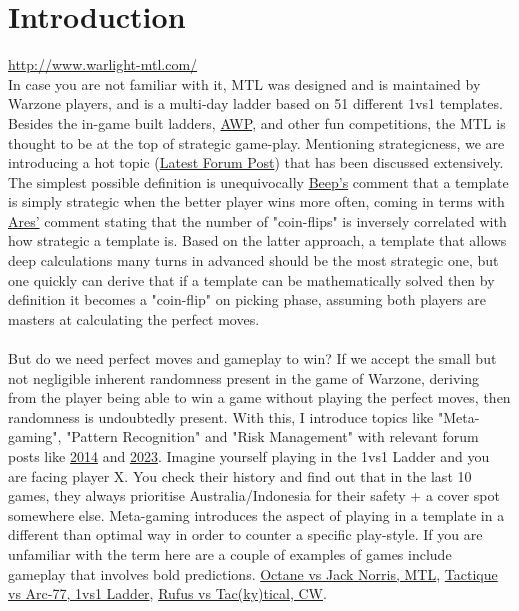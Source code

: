 \newpage
\section{Introduction} \label{introduction}


\url{http://www.warlight-mtl.com/}
\newline
\\
In case you are not familiar with it, MTL was designed and is maintained by Warzone players, and is a multi-day ladder based on 51 different 1vs1 templates. Besides the in-game built ladders, \href{https://www.warzone.com/Forum/262655-awp-world-tour-magazine}{AWP}, and other fun competitions, the MTL is thought to be at the top of strategic game-play. Mentioning strategicness, we are introducing a hot topic (\href{https://www.warzone.com/Forum/721296-makes-template-strategic}{Latest Forum Post}) that has been discussed extensively. The simplest possible definition is unequivocally \href{https://www.warzone.com/Forum/721296-makes-template-strategic?Offset=16}{Beep's} comment that a template is simply strategic when the better player wins more often, coming in terms with \href{https://www.warzone.com/Forum/721296-makes-template-strategic?Offset=8}{Ares'} comment stating that the number of "coin-flips" is inversely correlated with how strategic a template is. Based on the latter approach, a template that allows deep calculations many turns in advanced should be the most strategic one, but one quickly can derive that if a template can be mathematically solved then by definition it becomes a "coin-flip" on picking phase, assuming both players are masters at calculating the perfect moves. 
\\
\\
But do we need perfect moves and gameplay to win? If we accept the small but not negligible inherent randomness present in the game of Warzone, deriving from the player being able to win a game without playing the perfect moves, then randomness is undoubtedly present. With this, I introduce topics like "Meta-gaming", "Pattern Recognition" and "Risk Management" with relevant forum posts like \href{https://www.warzone.com/Forum/52866-metagame}{2014} and \href{https://www.warzone.com/Forum/735633-pinnacle-metagaming}{2023}. Imagine yourself playing in the 1vs1 Ladder and you are facing player X. You check their history and find out that in the last 10 games, they always prioritise Australia/Indonesia for their safety + a cover spot somewhere else. Meta-gaming introduces the aspect of playing in a template in a different than optimal way in order to counter a specific play-style. If you are unfamiliar with the term here are a couple of examples of games include gameplay that involves bold predictions. \href{https://www.warzone.com/MultiPlayer?GameID=37186464}{Octane vs Jack Norris, MTL}, \href{https://www.warzone.com/MultiPlayer?GameID=36615381}{Tactique vs Arc-77, 1vs1 Ladder}, \href{https://www.warzone.com/MultiPlayer?GameID=35830458}{Rufus vs Tac(ky)tical, CW}.
